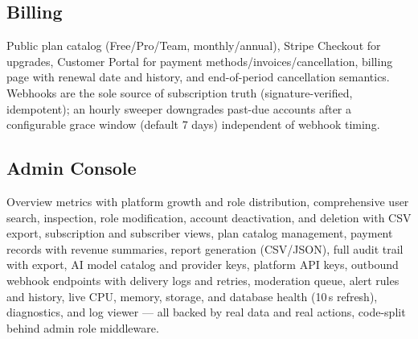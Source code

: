 \subsection{Billing}
Public plan catalog (Free/Pro/Team, monthly/annual), Stripe Checkout for
upgrades, Customer Portal for payment methods/invoices/cancellation, billing
page with renewal date and history, and end-of-period cancellation semantics.
Webhooks are the sole source of subscription truth (signature-verified,
idempotent); an hourly sweeper downgrades past-due accounts after a
configurable grace window (default 7 days) independent of webhook timing.

\subsection{Admin Console}
Overview metrics with platform growth and role distribution, comprehensive user
search, inspection, role modification, account deactivation, and deletion with
CSV export, subscription and subscriber views, plan catalog management,
payment records with revenue summaries, report generation (CSV/JSON), full
audit trail with export, AI model catalog and provider keys, platform API
keys, outbound webhook endpoints with delivery logs and retries, moderation
queue, alert rules and history, live CPU, memory, storage, and database health
(10\,s refresh), diagnostics, and log viewer --- all backed by real data and
real actions, code-split behind admin role middleware.
